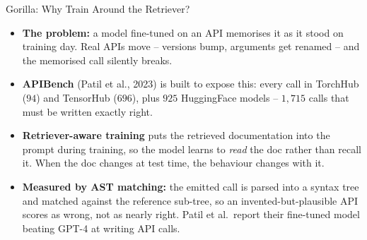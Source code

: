 \begin{frame}{Gorilla: Why Train Around the Retriever?}
\begin{itemize}
  \item \textbf{The problem:} a model fine-tuned on an API memorises it as it stood on training day. Real APIs move -- versions bump, arguments get renamed -- and the memorised call silently breaks.
  \pause
  \item \textbf{APIBench} (Patil et al., 2023) is built to expose this: every call in TorchHub ($94$) and TensorHub ($696$), plus $925$ HuggingFace models -- $1{,}715$ calls that must be written exactly right.
  \pause
  \item \textbf{Retriever-aware training} puts the retrieved documentation into the prompt during training, so the model learns to \emph{read} the doc rather than recall it. When the doc changes at test time, the behaviour changes with it.
  \pause
  \item \textbf{Measured by AST matching:} the emitted call is parsed into a syntax tree and matched against the reference sub-tree, so an invented-but-plausible API scores as wrong, not as nearly right. Patil et al.\ report their fine-tuned model beating GPT-4 at writing API calls.
\end{itemize}
\end{frame}

